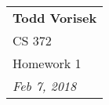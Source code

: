 \documentclass{article}
\begin{document}
    \null\hfill\begin{tabular}[t]{l@{}}
    \textbf{Todd Vorisek} \\
    CS 372 \\
    Homework 1\\
    \textit{Feb 7, 2018} \\
    \end{tabular}\\
    
\end{document}
